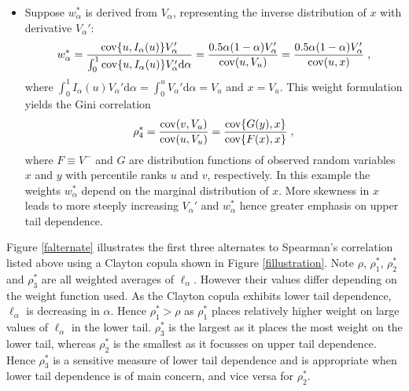 \documentclass[authoryear]{elsarticle}
\newcommand{\cov}{{\rm cov}}
\newcommand{\de}{\mathrm{d}}
\newcommand{\fref}[1]{Figure \ref{#1}}
\begin{document}
\begin{itemize}
\item Suppose $w^*_\alpha$ is derived from $V_\alpha$, representing the inverse distribution of $x$ with derivative $V_\alpha'$:
$$
w^*_\alpha = \frac{\cov\{u,I_\alpha(u)\}V_\alpha'}{\int_0^1 \cov\{u,I_\alpha(u)\}V_\alpha' \de\alpha}
=\frac{0.5\alpha(1-\alpha)V_\alpha'}{\cov(u,V_u)}
=\frac{0.5\alpha(1-\alpha)V_\alpha'}{\cov(u,x)} \;,
$$
where $\int_0^1 I_\alpha(u)V_\alpha'\de\alpha=\int_0^u V_\alpha'\de\alpha=V_u$ and $x=V_u$. This weight formulation yields the Gini correlation  \citep{schechtman1999proper}
$$
\rho_4^*=\frac{\cov(v,V_u)}{\cov(u,V_u)} = \frac{\cov\{G(y),x\}}{\cov\{F(x),x\}} \;,
$$
where $F\equiv V^-$ and $G$ are distribution functions of observed random variables $x$ and $y$ with percentile ranks $u$ and $v$, respectively.  In this example the weights $w^*_\alpha$ depend on the marginal distribution of $x$. More skewness in $x$ leads to more steeply increasing $V_\alpha'$ and  $w^*_\alpha$ hence greater emphasis on upper tail dependence.

\end{itemize}

\fref{falternate} illustrates the first three alternates to Spearman's correlation listed above using a Clayton copula shown in \fref{fillustration}. Note $\rho$, $\rho_1^*$, $\rho_2^*$ and $\rho_3^*$ are all weighted averages of $\ell_\alpha$. However their values differ depending on the weight function used. As the Clayton copula exhibits lower tail dependence, $\ell_\alpha$ is decreasing in $\alpha$. Hence $\rho_1^*>\rho$ as $\rho_1^*$ places relatively higher weight on large values of $\ell_\alpha$ in the lower tail. $\rho_3^*$ is the largest as it places the most weight on the lower tail, whereas $\rho_2^*$ is the smallest as it focusses on upper tail dependence. Hence $\rho_3^*$ is a sensitive measure of lower tail dependence and is appropriate when lower tail dependence is of main concern, and vice versa for $\rho_2^*$.
\end{document}
